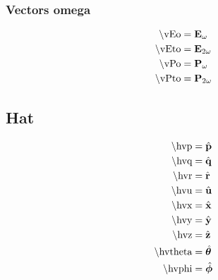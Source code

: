 \subsubsection{Vectors omega}
\begin{subequations}
\begin{align}
\textrm{\textbackslash vEo}                 & = \textbf{E}_{\omega}                \label{eqn:vEo} \\
\textrm{\textbackslash vEto}                & = \textbf{E}_{2 \omega}               \label{eqn:vEto} \\
\textrm{\textbackslash vPo}                 & = \textbf{P}_{\omega}                \label{eqn:vPo} \\
\textrm{\textbackslash vPto}                & = \textbf{P}_{2 \omega}               \label{eqn:vPto}
\end{align}
\end{subequations}


\subsection{Hat}
\begin{subequations}
\begin{align}
\textrm{\textbackslash hvp}                 & = \hat{\textbf{p}}                \label{eqn:hvp} \\
\textrm{\textbackslash hvq}                 & = \hat{\textbf{q}}                \label{eqn:hvq} \\
\textrm{\textbackslash hvr}                 & = \hat{\textbf{r}}                \label{eqn:hvr} \\
\textrm{\textbackslash hvu}                 & = \hat{\textbf{u}}                \label{eqn:hvu} \\
\textrm{\textbackslash hvx}                 & = \hat{\textbf{x}}                \label{eqn:hvx} \\
\textrm{\textbackslash hvy}                 & = \hat{\textbf{y}}                \label{eqn:hvy} \\
\textrm{\textbackslash hvz}                 & = \hat{\textbf{z}}                \label{eqn:hvz} \\
\textrm{\textbackslash hvtheta}             & = \hat{\bm{\theta}}            \label{eqn:hvtheta} \\
\textrm{\textbackslash hvphi}               & = \hat{\bm{\phi}}              \label{eqn:hvphi}
\end{align}
\end{subequations}


